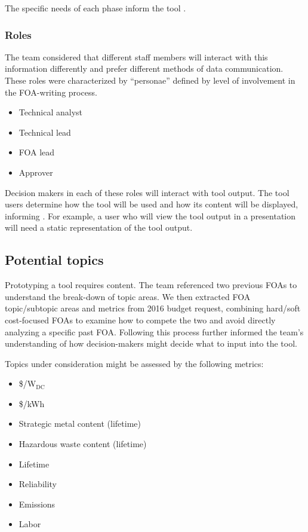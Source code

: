\documentclass[letterpaper,10pt,english]{sphinxmanual}
\begin{document}
The specific needs of each phase inform the tool .


\subsubsection{Roles}
\label{\detokenize{approach:roles}}
The team considered that different staff members will interact with this
information differently and prefer different methods of data
communication. These roles were characterized by “personae” defined by
level of involvement in the FOA-writing process.
\begin{itemize}
\item {} 
Technical analyst

\item {} 
Technical lead

\item {} 
FOA lead

\item {} 
Approver

\end{itemize}

Decision makers in each of these roles will interact with tool output.
The tool users determine how the tool will be used and how its content
will be displayed, informing .
For example, a user who will view the tool output in a presentation will
need a static representation of the tool output.


\subsection{Potential topics}
\label{\detokenize{approach:potential-topics}}
Prototyping a tool requires content. The team referenced two previous
FOAs to understand the break-down of topic areas. We then extracted FOA
topic/subtopic areas and metrics from 2016 budget request, combining
hard/soft cost-focused FOAs to examine how to compete the two and avoid
directly analyzing a specific past FOA. Following this process further
informed the team’s understanding of how decision-makers might decide
what to input into the tool.

Topics under consideration might be assessed by the following metrics:
\begin{itemize}
\item {} 
\$/W$_{\text{DC}}$

\item {} 
\$/kWh

\item {} 
Strategic metal content (lifetime)

\item {} 
Hazardous waste content (lifetime)

\item {} 
Lifetime

\item {} 
Reliability

\item {} 
Emissions

\item {} 
Labor

\end{itemize}
\end{document}
